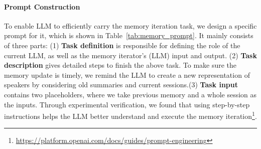 \documentclass[authoryear,preprint,review,12pt]{elsarticle}
\begin{document}
\paragraph{Prompt Construction} To enable LLM to efficiently carry the memory iteration task, we design a specific prompt for it, which is shown in Table~\ref{tab:memory_prompt}. It mainly consists of three parts: (1) \textbf{Task definition} is responsible for defining the role of the current LLM, as well as the memory iterator's (LLM) input and output. (2) \textbf{Task description} gives detailed steps to finish the above task. To make sure the memory update is timely, we remind the LLM to create a new representation of speakers by considering old summaries and current sessions.(3) \textbf{Task input} contains two placeholders, where we take previous memory and a whole session as the inputs. Through experimental verification, we found that using step-by-step instructions helps the LLM better understand and execute the memory iteration\footnote{\url{https://platform.openai.com/docs/guides/prompt-engineering}}.
\end{document}
